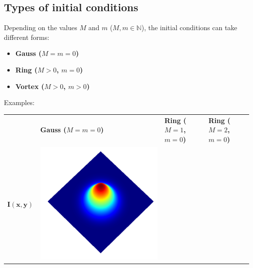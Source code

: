 \documentclass[a4paper, 12pt]{article}
\begin{document}
\subsection{Types of initial conditions}

Depending on the values $M$ and $m$ ($M, m \in \mathbb{N}$), the initial conditions can take different forms:
\begin{itemize}
\item \textbf{Gauss ($M=m=0$)} 
\item \textbf{Ring ($M>0$, $m=0$)} 
\item \textbf{Vortex ($M>0$, $m>0$)}
\end{itemize}
Examples:
\begin{center}
\begin{tabular}{M{1.5cm}M{5cm}M{5cm}M{5cm}}
\ & \textbf{Gauss ($M=m=0$)} & \textbf{Ring ($M=1$, $m=0$)} & \textbf{Ring ($M=2$, $m=0$)} \\
 $\mathbf{I(x,y)}$ &
\includegraphics[width=\linewidth]{../resources/intensity_M=0.png} & 

\end{tabular}
\end{center}
\end{document}
